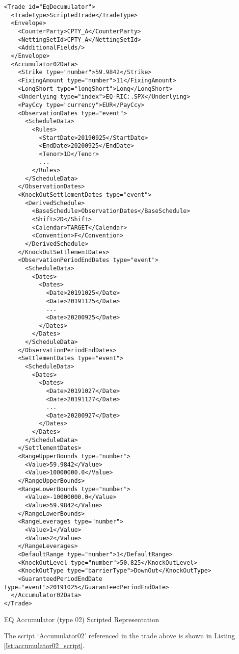 \begin{listing}[H]
\begin{verbatim}
<Trade id="EqDecumulator">
  <TradeType>ScriptedTrade</TradeType>
  <Envelope>
    <CounterParty>CPTY_A</CounterParty>
    <NettingSetId>CPTY_A</NettingSetId>
    <AdditionalFields/>
  </Envelope>
  <Accumulator02Data>
    <Strike type="number">59.9842</Strike>
    <FixingAmount type="number">11</FixingAmount>
    <LongShort type="longShort">Long</LongShort>
    <Underlying type="index">EQ-RIC:.SPX</Underlying>
    <PayCcy type="currency">EUR</PayCcy>
    <ObservationDates type="event">
      <ScheduleData>
        <Rules>
          <StartDate>20190925</StartDate>
          <EndDate>20200925</EndDate>
          <Tenor>1D</Tenor>
          ...
        </Rules>
      </ScheduleData>
    </ObservationDates>
    <KnockOutSettlementDates type="event">
      <DerivedSchedule>
        <BaseSchedule>ObservationDates</BaseSchedule>
        <Shift>2D</Shift>
        <Calendar>TARGET</Calendar>
        <Convention>F</Convention>
      </DerivedSchedule>
    </KnockOutSettlementDates>
    <ObservationPeriodEndDates type="event">
      <ScheduleData>
        <Dates>
          <Dates>
            <Date>20191025</Date>
            <Date>20191125</Date>
            ...
            <Date>20200925</Date>
          </Dates>
        </Dates>
      </ScheduleData>
    </ObservationPeriodEndDates>
    <SettlementDates type="event">
      <ScheduleData>
        <Dates>
          <Dates>
            <Date>20191027</Date>
            <Date>20191127</Date>
            ...
            <Date>20200927</Date>
          </Dates>
        </Dates>
      </ScheduleData>
    </SettlementDates>
    <RangeUpperBounds type="number">
      <Value>59.9842</Value>
      <Value>10000000.0</Value>
    </RangeUpperBounds>
    <RangeLowerBounds type="number">
      <Value>-10000000.0</Value>
      <Value>59.9842</Value>
    </RangeLowerBounds>
    <RangeLeverages type="number">
      <Value>1</Value>
      <Value>2</Value>
    </RangeLeverages>
    <DefaultRange type="number">1</DefaultRange>
    <KnockOutLevel type="number">50.825</KnockOutLevel>
    <KnockOutType type="barrierType">DownOut</KnockOutType>
    <GuaranteedPeriodEndDate type="event">20191025</GuaranteedPeriodEndDate>
  </Accumulator02Data>
</Trade>
\end{verbatim}
\caption{EQ Accumulator (type 02) Scripted Representation}
\label{lst:eqaccumulator02}
\end{listing}

The script `Accumulator02' referenced in the trade above is shown in Listing \ref{lst:accumulator02_script}.

